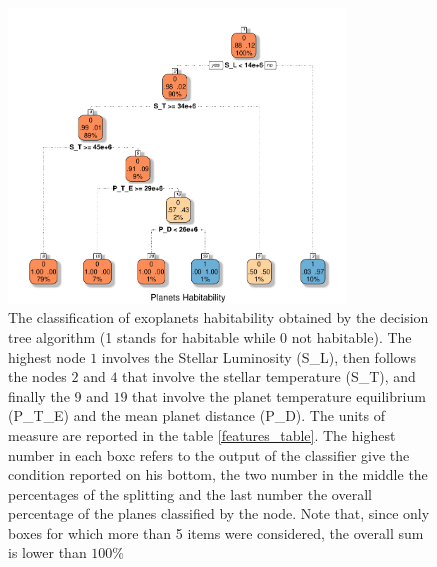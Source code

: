 \documentclass[
12pt, %
a4paper, %
oneside, %
headinclude,footinclude, %
BCOR5mm, %
]{scrartcl}
\begin{document}
\begin{figure}[h]
\begin{center}
\includegraphics[width=0.8\textwidth]{Pic/DecisionTree.pdf}
\caption{The classification of exoplanets habitability obtained by the decision tree algorithm (1 stands for habitable while 0 not habitable). The highest node $1$ involves the Stellar Luminosity (S\_L), then follows the nodes $2$ and $4$ that involve the stellar temperature (S\_T), and finally the $9$ and $19$ that involve the planet temperature equilibrium (P\_T\_E) and the mean planet distance (P\_D). The units of measure are reported in the table \ref{features_table}. The highest number in each boxc refers to the output of the classifier give the condition reported on his bottom, the two number in the middle the percentages of the splitting and the last number the overall percentage of the planes classified by the node. Note that, since only boxes for which more than 5 items were considered, the overall sum is lower than $100 \%$}
\label{DecisionTree}
\end{center}
\end{figure}
\end{document}

